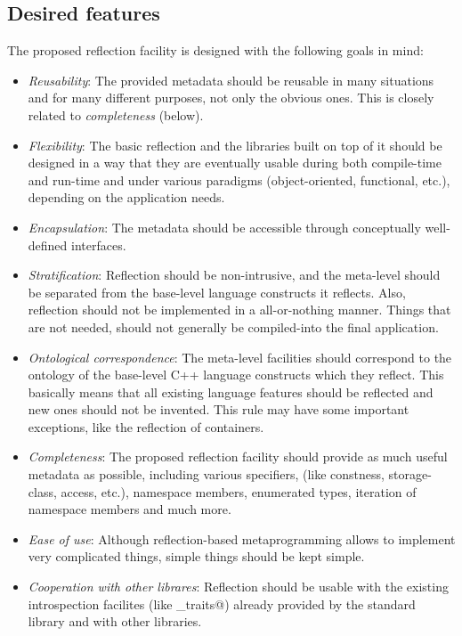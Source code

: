\subsection{Desired features} 

The proposed reflection facility is designed with the following
goals in mind:

\begin{itemize}
\item {\em Reusability}: The provided metadata should be reusable
in many situations and for many different purposes, not only
the obvious ones. This is closely related to {\em completeness} (below).

\item {\em Flexibility}: The basic reflection and the libraries
built on top of it should be designed
in a way that they are eventually usable during both compile-time
and run-time and under various paradigms (object-oriented, functional, etc.),
depending on the application needs.

\item {\em  Encapsulation}: The metadata should be accessible
through conceptually well-defined interfaces.

\item {\em  Stratification}: Reflection should be non-intrusive,
and the meta-level should be separated from the base-level language
constructs it reflects. Also, reflection should not be implemented
in a all-or-nothing manner. Things that are not needed, should not generally
be compiled-into the final application.

\item {\em  Ontological correspondence}: The meta-level facilities should
correspond to the ontology of the base-level C++ language constructs
which they reflect. This basically means that all existing language
features should be reflected and new ones should not be invented.
This rule may have some important exceptions, like the reflection of
containers. 

\item {\em  Completeness}: The proposed reflection facility should
provide as much useful metadata as possible, including various specifiers,
(like constness, storage-class, access, etc.), namespace members,
enumerated types, iteration of namespace members and much more.

\item {\em  Ease of use}: Although reflection-based metaprogramming
allows to implement very complicated things, simple things
should be kept simple.

\item {\em  Cooperation with other librares}: Reflection should be
usable with the existing introspection facilites (like \verb@type_traits@)
already provided by the standard library and with other libraries.
\end{itemize}
